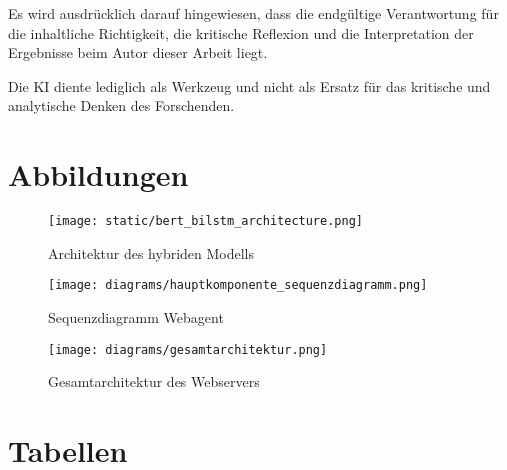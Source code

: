 Es wird ausdrücklich darauf hingewiesen, dass die endgültige Verantwortung für die inhaltliche Richtigkeit, die kritische Reflexion und die Interpretation der 
Ergebnisse beim Autor dieser Arbeit liegt.

Die KI diente lediglich als Werkzeug und nicht als Ersatz für das kritische und analytische Denken des Forschenden.

\newpage

\section{Abbildungen}

\begin{figure}[htbp]
    \begin{center}
        \texttt{[image: static/bert\_bilstm\_architecture.png]}
        \caption{\label{fig:bert_bilstm_architecture} Architektur des hybriden Modells \cite{wang2021covid19fakenewsdetection}}
    \end{center}
\end{figure}

\begin{figure}[htbp]
    \begin{center}
        \texttt{[image: diagrams/hauptkomponente\_sequenzdiagramm.png]}
        \caption{\label{fig:seq_hauptkomponente} Sequenzdiagramm Webagent}
    \end{center}
\end{figure}

\begin{figure}[htbp]
    \begin{center}
        \texttt{[image: diagrams/gesamtarchitektur.png]}
        \caption{\label{fig:gesamtarchitektur} Gesamtarchitektur des Webservers}
    \end{center}
\end{figure}

\newpage

\section{Tabellen}


